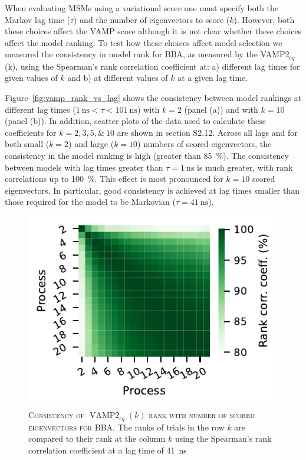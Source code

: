 \documentclass[journal=jacsat,manuscript=article]{achemso}
\begin{document}
When evaluating MSMs using a variational score one must specify both the Markov lag time ($\tau$) and the number of eigenvectors to score ($k$).  However, both these choices affect the VAMP score although it is not clear whether these choices affect the model ranking. To test how these choices affect model selection we measured the consistency in model rank for BBA, as measured by the VAMP2$_{eq}$(k), using the Spearman's rank correlation coefficient at: a) different lag times for given values of $k$ and b) at different values of $k$ at a given lag time. 

Figure~\ref{fig:vamp_rank_vs_lag} shows the consistency between model rankings at different lag times ($\SI{1}{\nano\second} < \tau < \SI{101}{\nano\second}$) with $k=2$ (panel (a)) and with $k=10$ (panel (b)). In addition, scatter plots of the data used to calculate these coefficients for $k=2, 3, 5, \&\ 10$ are shown in section S2.12.  Across all lags and for both small ($k=2$) and large ($k=10$) numbers of scored eigenvectors, the consistency in the model ranking is high (greater than \SI{85}{\percent}). The consistency between models with lag times greater than $\tau=\SI{1}{\nano\second}$ is much greater, with rank correlations up to \SI{100}{\percent}.  This effect is most pronounced for $k=10$ scored eigenvectors. In particular, good consistency is achieved at lag times smaller than those required for the model to be Markovian ($\tau=\SI{41}{\nano\second}$).


\begin{figure}[ht]
    \centering
    \includegraphics{results4/vampeq_rank_vs_proc.pdf}
    \caption{\textsc{Consistency of $\operatorname{VAMP2}_{eq}(k)$ rank with number of scored eigenvectors for BBA}. The ranks of trials in the row $k$ are compared to their rank at the column $k$ using the Spearman's rank correlation coefficient at a lag time of \SI{41}{\nano\second}}
    \label{fig:vampeq_rank_vs_n_procs}
\end{figure}
\end{document}
